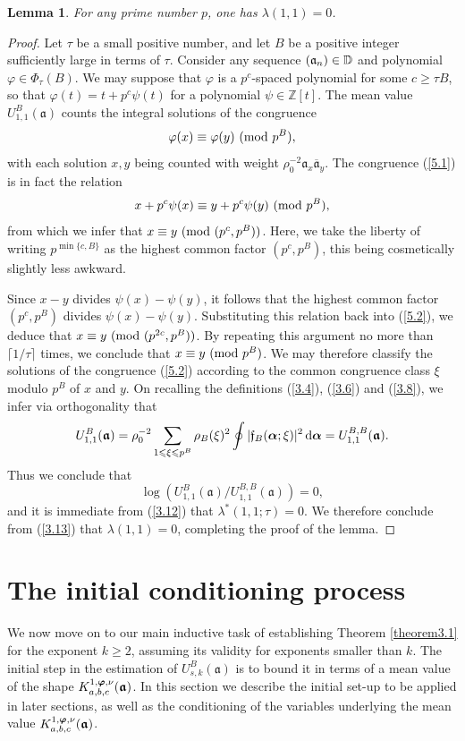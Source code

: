 \documentclass[12pt,reqno]{amsart}
\newtheorem{lemma}[theorem]{Lemma}
\theoremstyle{definition}
\theoremstyle{remark}
\numberwithin{equation}{section}
\newcommand{\mmod}[1]{\,\,(\text{\rm mod}\,\,#1)}
\def\dbZ{{\mathbb Z}}\def\dbQ{{\mathbb Q}}
\def\gra{{\mathfrak a}}\def\grA{{\mathfrak A}}\def\bfgra{{\boldsymbol \gra}}
\def\grf{{\mathfrak f}}\def\grF{{\mathfrak F}}
\def\lam{{\lambda}} \def\Lam{{\Lambda}} \def\Lamtil{{\widetilde \Lambda}}
\def\le{\leqslant} \def\ge{\geqslant} \def\pleq{\preccurlyeq} \def\ple{\prec}
\def\d{{\,{\rm d}}}
\begin{document}
\begin{lemma}\label{lemma5.1} For any prime number $p$, one has $\lam(1,1)=0$.
\end{lemma}

\begin{proof} Let $\tau $ be a small positive number, and let $B$ be a positive integer 
sufficiently large in terms of $\tau$. Consider any sequence $(\gra_n)\in \dbD$ and 
polynomial $\varphi\in \Phi_\tau(B)$. We may suppose that $\varphi$ is a $p^c$-spaced 
polynomial for some $c\ge \tau B$, so that $\varphi(t)=t+p^c\psi(t)$ for a polynomial 
$\psi\in \dbZ[t]$. The mean value $U_{1,1}^B(\bfgra)$ counts the integral solutions of the 
congruence
\begin{equation}\label{5.1}
\varphi(x)\equiv \varphi(y)\mmod{p^B},
\end{equation}
with each solution $x,y$ being counted with weight $\rho_0^{-2}\gra_x{\overline \gra_y}$. 
The congruence (\ref{5.1}) is in fact the relation
\begin{equation}\label{5.2}
x+p^c\psi(x)\equiv y+p^c\psi(y)\mmod{p^B},
\end{equation}
from which we infer that $x\equiv y\mmod{(p^c,p^B)}$. Here, we take the liberty of writing 
$p^{\min\{c,B\}}$ as the highest common factor $(p^c,p^B)$, this being cosmetically 
slightly less awkward.\par

Since $x-y$ divides $\psi(x)-\psi(y)$, it follows that the highest common factor $(p^c,p^B)$ 
divides $\psi(x)-\psi(y)$. Substituting this relation back into (\ref{5.2}), we deduce that 
$x\equiv y\mmod{(p^{2c},p^B)}$. By repeating this argument no more than 
$\lceil 1/\tau\rceil $ times, we conclude that $x\equiv y\mmod{p^B}$. We may therefore 
classify the solutions of the congruence (\ref{5.2}) according to the common congruence 
class $\xi$ modulo $p^B$ of $x$ and $y$. On recalling the definitions (\ref{3.4}), (\ref{3.6}) 
and (\ref{3.8}), we infer via orthogonality that
$$U_{1,1}^B(\bfgra)=\rho_0^{-2}\sum_{1\le \xi\le p^B}\rho_B(\xi)^2\oint 
|\grf_B(\bfalp;\xi)|^2\d\bfalp =U_{1,1}^{B,B}(\bfgra).$$
Thus we conclude that
$$\log \left( U_{1,1}^B(\bfgra)/U_{1,1}^{B,B}(\bfgra)\right) =0,$$
and it is immediate from (\ref{3.12}) that $\lam^*(1,1;\tau)=0$. We therefore conclude 
from (\ref{3.13}) that $\lam(1,1)=0$, completing the proof of the lemma.
\end{proof}

\section{The initial conditioning process} We now move on to our main inductive task of 
establishing Theorem \ref{theorem3.1} for the exponent $k\ge 2$, assuming its validity 
for exponents smaller than $k$. The initial step in the estimation of $U_{s,k}^B(\bfgra)$ 
is to bound it in terms of a mean value of the shape $K_{a,b,c}^{1,\bfvarphi,\nu}(\bfgra)$. 
In this section we describe the initial set-up to be applied in later sections, as well as the 
conditioning of the variables underlying the mean value 
$K_{a,b,c}^{1,\bfvarphi,\nu}(\bfgra)$.\par
 
\end{document}
